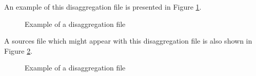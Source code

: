 \documentclass[11pt]{article}
\begin{document}
An example of this disaggregation file is presented in Figure \ref{fig:disaggregation}.
\begin{figure}[H]
	\begin{framed}
		
	\end{framed}
	\caption{Example of a disaggregation file}
	\label{fig:disaggregation}
\end{figure}

A sources file which might appear with this disaggregation file is also shown in Figure \ref{fig:disaggregation-sources}.
\begin{figure}[H]
	\begin{framed}
		
	\end{framed}
	\caption{Example of a disaggregation file}
	\label{fig:disaggregation-sources}
\end{figure}
\end{document}
